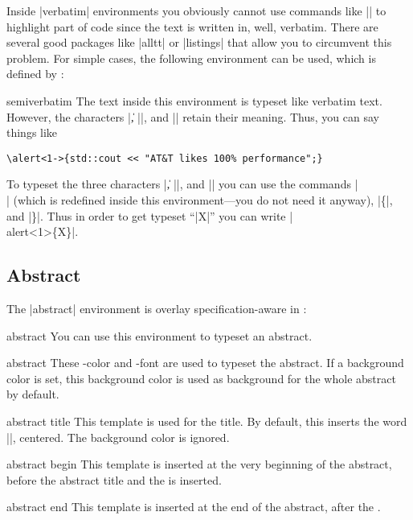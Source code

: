 Inside |{verbatim}| environments you obviously cannot use commands like |\alert<2>| to highlight part of code since the text is written in, well, verbatim. There are several good packages like |alltt| or |listings| that allow you to circumvent this problem. For simple cases, the following environment can be used, which is defined by \beamer:

\begin{environment}{{semiverbatim}}
  The text inside this environment is typeset like verbatim text. However, the characters |\|, |{|, and |}| retain their meaning. Thus, you can say things like
\begin{verbatim}
\alert<1->{std::cout << "AT&T likes 100% performance";}
\end{verbatim}

  To typeset the three characters |\|, |{|, and |}| you can use the commands |\\| (which is redefined inside this environment---you do not need it anyway), |\{|, and |\}|. Thus in order to get typeset ``|\alert<1>{X}|'' you can write |\\alert<1>\{X\}|.
\end{environment}


\subsection{Abstract}

The |{abstract}| environment is overlay specification-aware in \beamer:

\begin{environment}{{abstract}}
  You can use this environment to typeset an abstract.

  \begin{element}{abstract}\no\yes\yes
    These \beamer-color and -font are used to typeset the abstract. If a background color is set, this background color is used as background for the whole abstract by default.
  \end{element}

  \begin{element}{abstract title}\yes\yes\yes
    This template is used for the title. By default, this inserts the word |\abstractname|, centered. The background color is ignored.
  \end{element}

  \begin{element}{abstract begin}\yes\no\no
    This template is inserted at the very beginning of the abstract, before the abstract title and the  is inserted.
  \end{element}

  \begin{element}{abstract end}\yes\no\no
    This template is inserted at the end of the abstract, after the .
  \end{element}
\end{environment}


